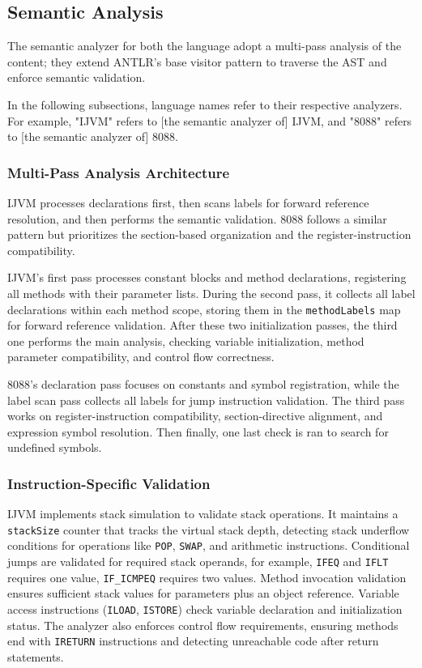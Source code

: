 \documentclass[11pt]{article}
\begin{document}
\subsection{Semantic Analysis}
The semantic analyzer for both the language adopt a multi-pass analysis of the content; they extend ANTLR's base visitor pattern to traverse the AST and enforce semantic validation. 

In the following subsections, language names refer to their respective analyzers. For example, "IJVM" refers to [the semantic analyzer of] IJVM, and "8088" refers to [the semantic analyzer of] 8088.

\subsubsection{Multi-Pass Analysis Architecture}
IJVM processes declarations first, then scans labels for forward reference resolution, and then performs the semantic validation. 8088 follows a similar pattern but prioritizes the section-based organization and the register-instruction compatibility.

IJVM's first pass processes constant blocks and method declarations, registering all methods with their parameter lists. During the second pass, it collects all label declarations within each method scope, storing them in the \texttt{methodLabels} map for forward reference validation. After these two initialization passes, the third one performs the main analysis, checking variable initialization, method parameter compatibility, and control flow correctness.

8088's declaration pass focuses on constants and symbol registration, while the label scan pass collects all labels for jump instruction validation. The third pass works on register-instruction compatibility, section-directive alignment, and expression symbol resolution. Then finally, one last check is ran to search for undefined symbols.

\subsubsection{Instruction-Specific Validation}
IJVM implements stack simulation to validate stack operations. It maintains a \texttt{stackSize} counter that tracks the virtual stack depth, detecting stack underflow conditions for operations like \texttt{POP}, \texttt{SWAP}, and arithmetic instructions. Conditional jumps are validated for required stack operands, for example, \texttt{IFEQ} and \texttt{IFLT} requires one value, \texttt{IF\_ICMPEQ} requires two values. Method invocation validation ensures sufficient stack values for parameters plus an object reference. Variable access instructions (\texttt{ILOAD}, \texttt{ISTORE}) check variable declaration and initialization status. The analyzer also enforces control flow requirements, ensuring methods end with \texttt{IRETURN} instructions and detecting unreachable code after return statements.
\end{document}
